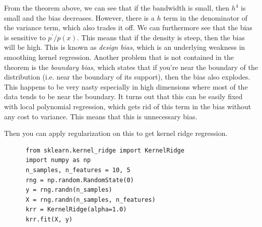   From the theorem above, we can see that if the bandwidth is small, then $h^4$ is small and the bias decreases. However, there is a $h$ term in the denominator of the variance term, which also trades it off. We can furthermore see that the bias is sensitive to $p^\prime / p(x)$. This means that if the density is steep, then the bias will be high. This is known as \textit{design bias}, which is an underlying weakness in smoothing kernel regression. Another problem that is not contained in the theorem is the \textit{boundary bias}, which states that if you're near the boundary of the distribution (i.e. near the boundary of its support), then the bias also explodes. This happens to be very nasty especially in high dimensions where most of the data tends to be near the boundary. It turns out that this can be easily fixed with local polynomial regression, which gets rid of this term in the bias without any cost to variance. This means that this is unnecessary bias. 

  Then you can apply regularization on this to get kernel ridge regression. 

  \begin{code}
    \begin{lstlisting}
      from sklearn.kernel_ridge import KernelRidge
      import numpy as np
      n_samples, n_features = 10, 5
      rng = np.random.RandomState(0)
      y = rng.randn(n_samples)
      X = rng.randn(n_samples, n_features)
      krr = KernelRidge(alpha=1.0)
      krr.fit(X, y)
    \end{lstlisting}
  \end{code}

